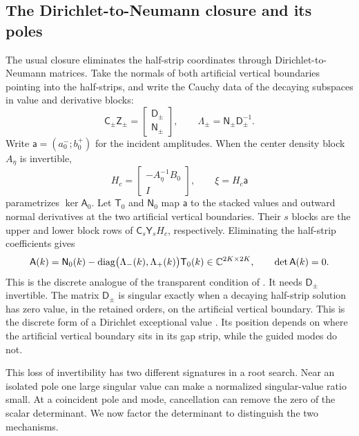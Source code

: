 \subsection{The Dirichlet-to-Neumann closure and its poles}\label{sec:dtn}
The usual closure eliminates the half-strip coordinates through
Dirichlet-to-Neumann matrices. Take the normals of both artificial vertical
boundaries pointing into the half-strips, and write the Cauchy data of the decaying
subspaces in value and derivative blocks:
\begin{equation}\label{eq:dtn}
  \mathsf C_\pm\mathsf Z_\pm=\begin{bmatrix}\mathsf D_\pm\\ \mathsf N_\pm\end{bmatrix},
  \qquad
  \Lambda_\pm=\mathsf N_\pm\mathsf D_\pm^{-1}.
\end{equation}
Write $\mathsf a=(a^-_0;b^+_0)$ for the incident amplitudes.
When the center density block $A_\eta$ is invertible,
\[
 H_c=\begin{bmatrix}-A_\eta^{-1}B_0\\ I\end{bmatrix},\qquad
 \xi=H_c\mathsf a
\]
parametrizes $\ker\mathsf A_0$. Let $\mathsf T_0$ and $\mathsf N_0$ map
$\mathsf a$ to the stacked values and outward normal derivatives at the
two artificial vertical boundaries. Their $s$ blocks are the upper and
lower block rows of $\mathsf C_s\mathsf Y_sH_c$, respectively. Eliminating
the half-strip coefficients gives
\begin{equation}\label{eq:port-matrix}
  \mathsf A(k)=\mathsf N_0(k)-\operatorname{diag}\bigl(\Lambda_-(k),\Lambda_+(k)\bigr)\mathsf T_0(k)
  \in\mathbb{C}^{2K\times2K},\qquad \det\mathsf A(k)=0 .
\end{equation}
This is the discrete analogue of the transparent condition of
\cite{Fliss2013}. It needs $\mathsf D_\pm$ invertible. The matrix $\mathsf D_\pm$
is singular exactly when a decaying half-strip solution has zero value, in the
retained orders, on the artificial vertical boundary. This is the discrete form of a
Dirichlet exceptional value \cite[Thm.~4.1]{Fliss2013}. Its position depends
on where the artificial vertical boundary sits in its gap strip, while the guided modes do not.

This loss of invertibility has two different signatures in a root search.
Near an isolated pole one large singular value can make a normalized
singular-value ratio small. At a coincident pole and mode, cancellation can
remove the zero of the scalar determinant. We now factor the determinant
to distinguish the two mechanisms.

